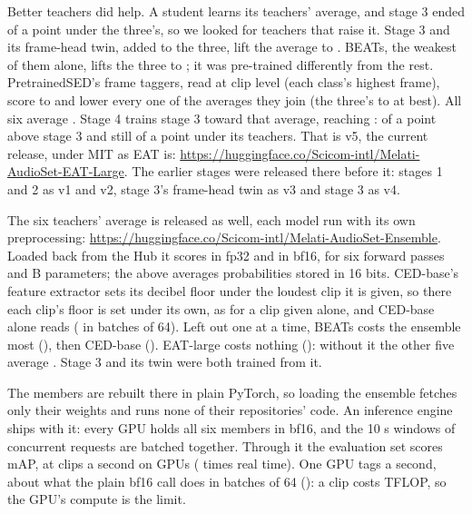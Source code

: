 \documentclass[10pt]{article}
\begin{document}
Better teachers did help. A student learns its teachers' average, and stage 3 ended  of a point under
the three's, so we looked for teachers that raise it. Stage 3 and its frame-head twin, added to the three, lift the
average to . BEATs, the weakest of them alone, lifts the three to ; it was
pre-trained differently from the rest. PretrainedSED's frame taggers, read at clip level (each class's highest frame),
score  to  and lower every one of the  averages they
join (the three's to  at best). All six average . Stage 4 trains stage 3
toward that average, reaching :  of a point above stage 3 and still  of a
point under its teachers. That is v5, the current release, under MIT as EAT is:
\url{https://huggingface.co/Scicom-intl/Melati-AudioSet-EAT-Large}. The earlier stages were released there before it:
stages 1 and 2 as v1 and v2, stage 3's frame-head twin as v3 and stage 3 as v4.

The six teachers' average is released as well, each model run with its own preprocessing:
\url{https://huggingface.co/Scicom-intl/Melati-AudioSet-Ensemble}. Loaded back from the Hub it scores 
in fp32 and  in bf16, for six forward passes and B parameters; the
 above averages probabilities stored in 16 bits. CED-base's feature extractor sets its decibel floor
under the loudest clip it is given, so there each clip's floor is set under its own, as for a clip given alone, and
CED-base alone reads  ( in batches of 64).
Left out one at a time, BEATs costs the ensemble most (), then CED-base
(). EAT-large costs nothing (): without it the other five average
. Stage 3 and its twin were both trained from it.

The members are rebuilt there in plain PyTorch, so loading the ensemble fetches only their weights and runs none of
their repositories' code. An inference engine ships with it: every GPU holds all six members in bf16, and the 10 s
windows of concurrent requests are batched together. Through it the evaluation set scores  mAP, at
 clips a second on  GPUs ( times real time). One GPU tags
 a second, about what the plain bf16 call does in batches of 64 (): a clip
costs  TFLOP, so the GPU's compute is the limit.
\end{document}
